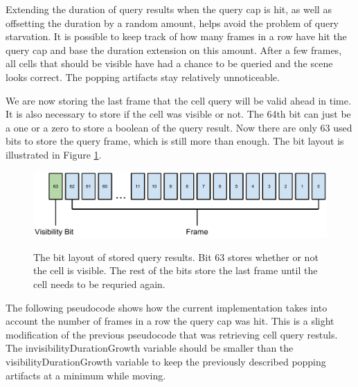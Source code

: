 \documentclass[12pt]{ucthesis}
\newcommand{\captionfonts}{\small\bf\ssp}
\begin{document}
Extending the duration of query results when the query cap is hit, as well as offsetting the duration by a random amount, helps avoid the problem of query starvation.
It is possible to keep track of how many frames in a row have hit the query cap and base the duration extension on this amount.
After a few frames, all cells that should be visible have had a chance to be queried and the scene looks correct.
The popping artifacts stay relatively unnoticeable.

We are now storing the last frame that the cell query will be valid ahead in time.
It is also necessary to store if the cell was visible or not.
The 64th bit can just be a one or a zero to store a boolean of the query result.
Now there are only 63 used bits to store the query frame, which is still more than enough.
The bit layout is illustrated in Figure \ref{fig:query-bits}.

\begin{figure}
\begin{center}
\includegraphics[width=\textwidth]{Images/QueryBits.pdf}
\captionfonts
\caption[Query Results Bit Layout]{The bit layout of stored query results. Bit 63 stores whether or not the cell is visible. The rest of the bits store the last frame until the cell needs to be requried again.}
\label{fig:query-bits}
\end{center}
\end{figure}

The following pseudocode shows how the current implementation takes into account the number of frames in a row the query cap was hit.
This is a slight modification of the previous pseudocode that was retrieving cell query restuls.
The invisibilityDurationGrowth variable should be smaller than the visibilityDurationGrowth variable to keep the previously described popping artifacts at a minimum while moving.
\end{document}
